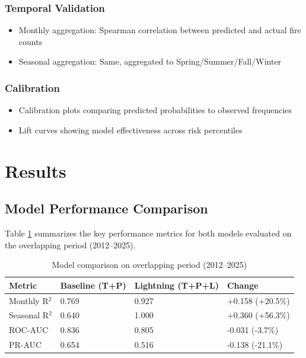 \documentclass[11pt,a4paper]{article}
\begin{document}
\subsubsection{Temporal Validation}
\begin{itemize}
    \item Monthly aggregation: Spearman correlation between predicted and actual fire counts
    \item Seasonal aggregation: Same, aggregated to Spring/Summer/Fall/Winter
\end{itemize}

\subsubsection{Calibration}
\begin{itemize}
    \item Calibration plots comparing predicted probabilities to observed frequencies
    \item Lift curves showing model effectiveness across risk percentiles
\end{itemize}

\section{Results}

\subsection{Model Performance Comparison}

Table \ref{tab:comparison} summarizes the key performance metrics for both models evaluated on the overlapping period (2012--2025).

\begin{table}[H]
\centering
\caption{Model comparison on overlapping period (2012--2025)}
\label{tab:comparison}
\begin{tabular}{llll}
\toprule
\textbf{Metric} & \textbf{Baseline (T+P)} & \textbf{Lightning (T+P+L)} & \textbf{Change} \\
\midrule
Monthly R$^2$ & 0.769 & 0.927 & +0.158 (+20.5\%) \\
Seasonal R$^2$ & 0.640 & 1.000 & +0.360 (+56.3\%) \\
ROC-AUC & 0.836 & 0.805 & -0.031 (-3.7\%) \\
PR-AUC & 0.654 & 0.516 & -0.138 (-21.1\%) \\
\bottomrule
\end{tabular}
\end{table}
\end{document}
